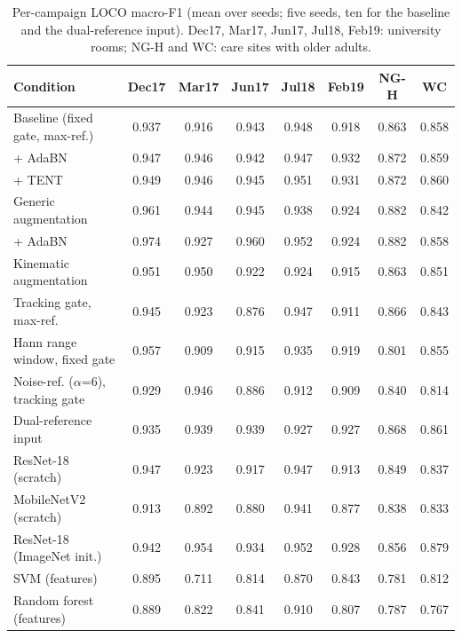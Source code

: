 \begin{table}[H]
\centering
\small
\caption{Per-campaign LOCO macro-F1 (mean over seeds; five seeds, ten for the baseline and the dual-reference input). Dec17, Mar17, Jun17, Jul18, Feb19: university rooms; NG-H and WC: care sites with older adults.}
\label{tab:percampaign}
\setlength{\tabcolsep}{4pt}
\begin{tabular}{lccccccc}
\toprule
Condition & Dec17 & Mar17 & Jun17 & Jul18 & Feb19 & NG-H & WC \\
\midrule
Baseline (fixed gate, max-ref.) & 0.937 & 0.916 & 0.943 & 0.948 & 0.918 & 0.863 & 0.858 \\
\quad + AdaBN & 0.947 & 0.946 & 0.942 & 0.947 & 0.932 & 0.872 & 0.859 \\
\quad + TENT & 0.949 & 0.946 & 0.945 & 0.951 & 0.931 & 0.872 & 0.860 \\
Generic augmentation & 0.961 & 0.944 & 0.945 & 0.938 & 0.924 & 0.882 & 0.842 \\
\quad + AdaBN & 0.974 & 0.927 & 0.960 & 0.952 & 0.924 & 0.882 & 0.858 \\
Kinematic augmentation & 0.951 & 0.950 & 0.922 & 0.924 & 0.915 & 0.863 & 0.851 \\
Tracking gate, max-ref. & 0.945 & 0.923 & 0.876 & 0.947 & 0.911 & 0.866 & 0.843 \\
Hann range window, fixed gate & 0.957 & 0.909 & 0.915 & 0.935 & 0.919 & 0.801 & 0.855 \\
Noise-ref. ($\alpha$=6), tracking gate & 0.929 & 0.946 & 0.886 & 0.912 & 0.909 & 0.840 & 0.814 \\
Dual-reference input & 0.935 & 0.939 & 0.939 & 0.927 & 0.927 & 0.868 & 0.861 \\
ResNet-18 (scratch) & 0.947 & 0.923 & 0.917 & 0.947 & 0.913 & 0.849 & 0.837 \\
MobileNetV2 (scratch) & 0.913 & 0.892 & 0.880 & 0.941 & 0.877 & 0.838 & 0.833 \\
ResNet-18 (ImageNet init.) & 0.942 & 0.954 & 0.934 & 0.952 & 0.928 & 0.856 & 0.879 \\
SVM (features) & 0.895 & 0.711 & 0.814 & 0.870 & 0.843 & 0.781 & 0.812 \\
Random forest (features) & 0.889 & 0.822 & 0.841 & 0.910 & 0.807 & 0.787 & 0.767 \\
\bottomrule
\end{tabular}
\end{table}